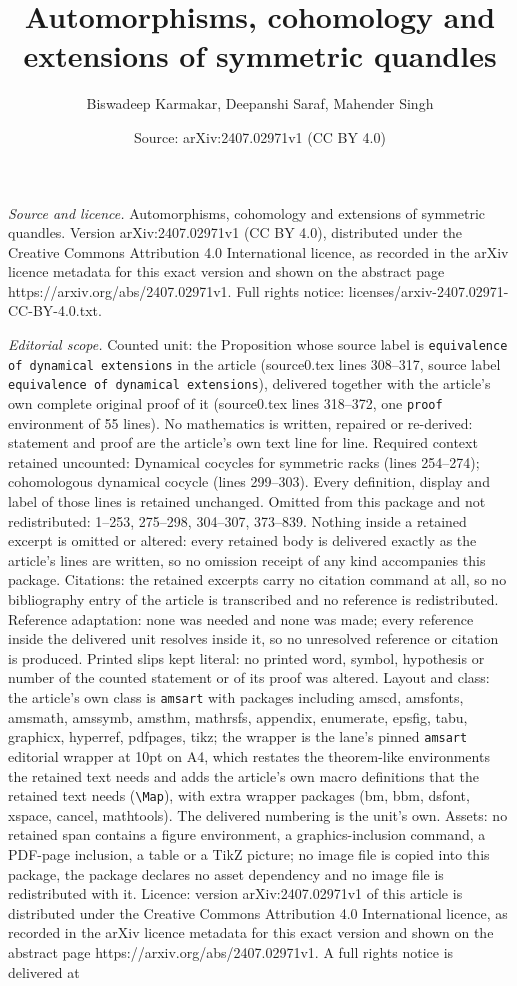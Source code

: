 \documentclass[10pt,a4paper]{amsart}
\title[Automorphisms, cohomology and extensions of symmetric quandl]{Automorphisms, cohomology and extensions of symmetric quandles}
\author{Biswadeep Karmakar, Deepanshi Saraf, Mahender Singh}
\date{Source: arXiv:2407.02971v1 (CC BY 4.0)}
\begin{document}
\maketitle

\noindent\emph{Source and licence.} Automorphisms, cohomology and extensions of symmetric quandles. Version arXiv:2407.02971v1 (CC BY 4.0), distributed under the Creative Commons Attribution 4.0 International licence, as recorded in the arXiv licence metadata for this exact version and shown on the abstract page https://arxiv.org/abs/2407.02971v1. Full rights notice: licenses/arxiv-2407.02971-CC-BY-4.0.txt.\par\smallskip

\noindent\textit{Editorial scope.} Counted unit: the Proposition whose source label is \texttt{equivalence of dynamical extensions} in the article (source0.tex lines 308--317, source label \texttt{equivalence of dynamical extensions}), delivered together with the article's own complete original proof of it (source0.tex lines 318--372, one \texttt{proof} environment of 55 lines). No mathematics is written, repaired or re-derived: statement and proof are the article's own text line for line. Required context retained uncounted: Dynamical cocycles for symmetric racks (lines 254--274); cohomologous dynamical cocycle (lines 299--303). Every definition, display and label of those lines is retained unchanged. Omitted from this package and not redistributed: 1--253, 275--298, 304--307, 373--839. Nothing inside a retained excerpt is omitted or altered: every retained body is delivered exactly as the article's lines are written, so no omission receipt of any kind accompanies this package. Citations: the retained excerpts carry no citation command at all, so no bibliography entry of the article is transcribed and no reference is redistributed. Reference adaptation: none was needed and none was made; every reference inside the delivered unit resolves inside it, so no unresolved reference or citation is produced. Printed slips kept literal: no printed word, symbol, hypothesis or number of the counted statement or of its proof was altered. Layout and class: the article's own class is \texttt{amsart} with packages including amscd, amsfonts, amsmath, amssymb, amsthm, mathrsfs, appendix, enumerate, epsfig, tabu, graphicx, hyperref, pdfpages, tikz; the wrapper is the lane's pinned \texttt{amsart} editorial wrapper at 10pt on A4, which restates the theorem-like environments the retained text needs and adds the article's own macro definitions that the retained text needs (\texttt{\textbackslash Map}), with extra wrapper packages (bm, bbm, dsfont, xspace, cancel, mathtools). The delivered numbering is the unit's own. Assets: no retained span contains a figure environment, a graphics-inclusion command, a PDF-page inclusion, a table or a TikZ picture; no image file is copied into this package, the package declares no asset dependency and no image file is redistributed with it. Licence: version arXiv:2407.02971v1 of this article is distributed under the Creative Commons Attribution 4.0 International licence, as recorded in the arXiv licence metadata for this exact version and shown on the abstract page https://arxiv.org/abs/2407.02971v1. A full rights notice is delivered at 
\end{document}
